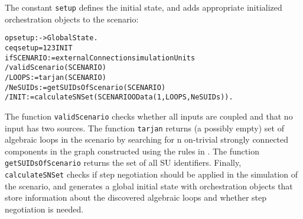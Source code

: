 The constant \texttt{setup} defines the initial state, and adds
appropriate initialized orchestration objects to the scenario:

\small
\begin{alltt}
op setup : -> GlobalState .
ceq setup = \char123INIT
  if SCENARIO := externalConnection simulationUnits
  / validScenario(SCENARIO)
  / LOOPS := tarjan(SCENARIO)
  / NeSUIDs := getSUIDsOfScenario(SCENARIO)
  / INIT := calculateSNSet(SCENARIO OData(1,LOOPS, NeSUIDs)) .
\end{alltt}
\normalsize

\noindent The function \texttt{validScenario} checks whether all inputs are coupled and that no input has two sources.   
The function \texttt{tarjan} returns (a possibly empty) set  of algebraic loops in the scenario by searching for n on-trivial strongly connected components in
the graph constructed using the rules  in \cite{Gomes2019c}.   
The function \texttt{getSUIDsOfScenario} returns  the set of all SU
identifiers. Finally, \texttt{calculateSNSet} checks if step negotiation 
should be applied in the simulation of the scenario, and generates a
global initial state with orchestration objects that store information
about the discovered algebraic loops and whether step negotiation is
needed.